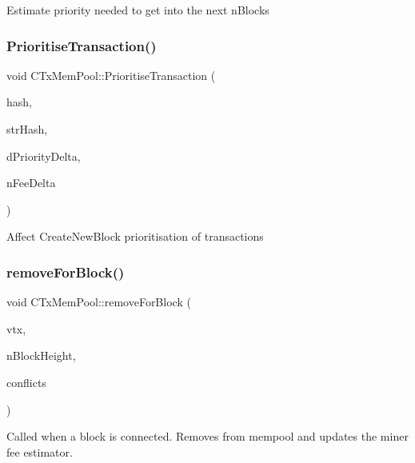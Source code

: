 Estimate priority needed to get into the next n\+Blocks \mbox{\label{class_c_tx_mem_pool_a1a0a00279c941051af1b74c5ebeac40d}} 
\subsubsection{\texorpdfstring{PrioritiseTransaction()}{PrioritiseTransaction()}}
{\footnotesize\ttfamily void C\+Tx\+Mem\+Pool\+::\+Prioritise\+Transaction (\begin{DoxyParamCaption}\item[{const \mbox{\hyperlink{classuint256}{uint256}}}]{hash,  }\item[{const std\+::string}]{str\+Hash,  }\item[{double}]{d\+Priority\+Delta,  }\item[{const C\+Amount \&}]{n\+Fee\+Delta }\end{DoxyParamCaption})}

Affect Create\+New\+Block prioritisation of transactions \mbox{\label{class_c_tx_mem_pool_ac97207311007676bd7ef056a625e0e0a}} 
\subsubsection{\texorpdfstring{removeForBlock()}{removeForBlock()}}
{\footnotesize\ttfamily void C\+Tx\+Mem\+Pool\+::remove\+For\+Block (\begin{DoxyParamCaption}\item[{const std\+::vector$<$ \mbox{\hyperlink{class_c_transaction}{C\+Transaction}} $>$ \&}]{vtx,  }\item[{unsigned int}]{n\+Block\+Height,  }\item[{std\+::list$<$ \mbox{\hyperlink{class_c_transaction}{C\+Transaction}} $>$ \&}]{conflicts }\end{DoxyParamCaption})}

Called when a block is connected. Removes from mempool and updates the miner fee estimator. \mbox{\label{class_c_tx_mem_pool_a251f595b6527be005634574ce5d01f70}} 
